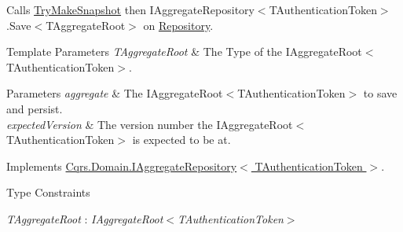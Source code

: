Calls \hyperlink{classCqrs_1_1Snapshots_1_1SnapshotRepository_a82ef7d630bd09e02b573658ab8d909dd_a82ef7d630bd09e02b573658ab8d909dd}{Try\+Make\+Snapshot} then I\+Aggregate\+Repository$<$\+T\+Authentication\+Token$>$.\+Save$<$\+T\+Aggregate\+Root$>$ on \hyperlink{classCqrs_1_1Snapshots_1_1SnapshotRepository_a64b1457cd45056fb7affd2aa8cd07d9e_a64b1457cd45056fb7affd2aa8cd07d9e}{Repository}. 


\begin{DoxyTemplParams}{Template Parameters}
{\em T\+Aggregate\+Root} & The Type of the I\+Aggregate\+Root$<$\+T\+Authentication\+Token$>$.\\
\hline
\end{DoxyTemplParams}

\begin{DoxyParams}{Parameters}
{\em aggregate} & The I\+Aggregate\+Root$<$\+T\+Authentication\+Token$>$ to save and persist.\\
\hline
{\em expected\+Version} & The version number the I\+Aggregate\+Root$<$\+T\+Authentication\+Token$>$ is expected to be at.\\
\hline
\end{DoxyParams}


Implements \hyperlink{interfaceCqrs_1_1Domain_1_1IAggregateRepository_a306baf8aa6faabe893f93e5db5d3517d_a306baf8aa6faabe893f93e5db5d3517d}{Cqrs.\+Domain.\+I\+Aggregate\+Repository$<$ T\+Authentication\+Token $>$}.

\begin{Desc}
\item[Type Constraints]\begin{description}
\item[{\em T\+Aggregate\+Root} : {\em I\+Aggregate\+Root$<$T\+Authentication\+Token$>$}]\end{description}
\end{Desc}
\mbox{\label{classCqrs_1_1Snapshots_1_1SnapshotRepository_a82ef7d630bd09e02b573658ab8d909dd_a82ef7d630bd09e02b573658ab8d909dd}} 
